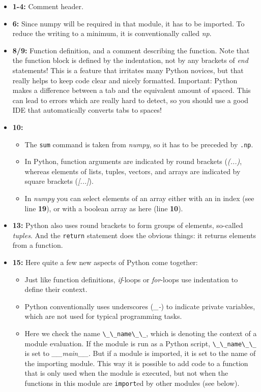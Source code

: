 \begin{itemize}
  \item \textbf{1-4:} Comment header.
  \item \textbf{6:} Since numpy will be required in that module, it has to be imported. To reduce the writing to a minimum, it is conventionally called \emph{np}.
  \item \textbf{8/9:} Function definition, and a comment describing the function. Note that the function block is defined by the indentation, not by any brackets of \emph{end} statements! This is a feature that irritates many Python novices, but that really helps to keep code clear and nicely formatted. Important: Python makes a difference between a tab and the equivalent amount of spaced. This can lead to errors which are really hard to detect, so you should use a good IDE that automatically converts tabs to spaces!
  \item \textbf{10:}
    \begin{itemize}
      \item The \lstinline{sum} command is taken from \emph{numpy}, so it has to be preceded by \lstinline{.np}.
      \item In Python, function arguments are indicated by round brackets (\emph{(...)}, whereas elements of lists, tuples, vectors, and arrays are indicated by square brackets (\emph{[...]}).
      \item In \emph{numpy} you can select elements of an array either with an in index (see line \textbf{19}), or with a boolean array as here (line \textbf{10}).
    \end{itemize}
  \item \textbf{13:} Python also uses round brackets to form groups of elements, so-called \emph{tuples}. And the \lstinline{return} statement does the obvious things: it returns elements from a function.
  \item \textbf{15:} Here quite a few new aspects of Python come together:
      \begin{itemize}
        \item Just like function definitions, \emph{if}-loops or \emph{for}-loops use indentation to define their context.
        \item Python conventionally uses underscores (\emph{\_-}) to indicate private variables, which are not used for typical programming tasks.
        \item Here we check the name \lstinline{\_\_name\_\_}, which is denoting the context of a module evaluation. If the module is run as a Python script, \lstinline{\_\_name\_\_} is set to \emph{\_\_main\_\_}. But if a module is imported, it is set to the name of the importing module. This way it is possible to add code to a function that is only used when the module is executed, but not when the functions in this module are \lstinline{import}ed by other modules (see below).

\end{itemize}
\end{itemize}
